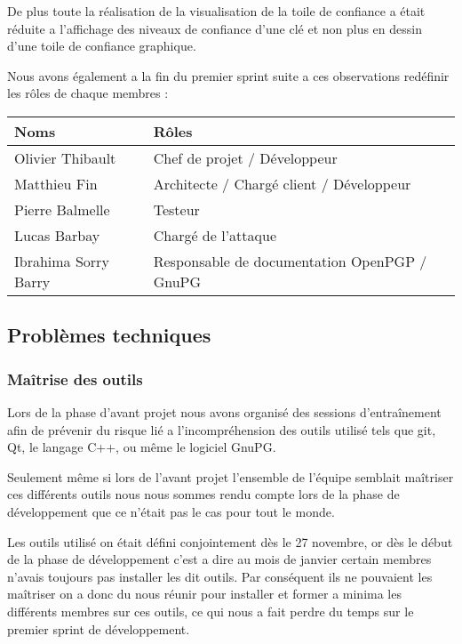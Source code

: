 \documentclass{../res/univ-projet}
\begin{document}
    De plus toute la réalisation de la visualisation de la toile de confiance a était réduite
    a l'affichage des niveaux de confiance d'une clé et non plus en dessin d'une toile de confiance graphique.

    Nous avons également a la fin du premier sprint suite a ces observations redéfinir les rôles de chaque membres : 

    \begin{tabular}{|l|l|}
      \hline
      \bfseries{Noms}      & \bfseries{Rôles}                             \\
      \hline
      Olivier Thibault     & Chef de projet / Développeur                 \\
      Matthieu Fin         & Architecte / Chargé client / Développeur     \\
      Pierre Balmelle      & Testeur                                      \\
      Lucas Barbay         & Chargé de l'attaque                          \\
      Ibrahima Sorry Barry & Responsable de documentation OpenPGP / GnuPG \\
      \hline

    \end{tabular}

    
  \subsection{Problèmes techniques}

    \subsubsection{Maîtrise des outils}

      Lors de la phase d'avant projet nous avons organisé des sessions d’entraînement afin
      de prévenir du risque lié a l’incompréhension des outils utilisé tels que git, Qt, le langage C++,
      ou même le logiciel GnuPG.

      Seulement même si lors de l'avant projet l'ensemble de l'équipe semblait maîtriser ces
      différents outils nous nous sommes rendu compte lors de la phase de développement que ce n'était pas le cas
      pour tout le monde.

      Les outils utilisé on était défini conjointement dès le 27 novembre, or dès le début de la phase de développement
      c'est a dire au mois de janvier certain membres n'avais toujours pas installer les dit outils. Par conséquent
      ils ne pouvaient les maîtriser on a donc du nous réunir pour installer et former a minima les différents membres
      sur ces outils, ce qui nous a fait perdre du temps sur le premier sprint de développement.
\end{document}
